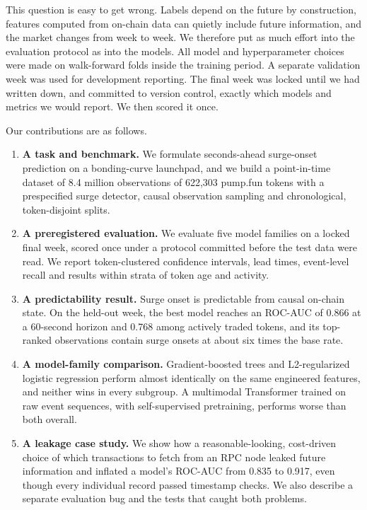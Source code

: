 This question is easy to get wrong. Labels depend on the future by construction, features computed from on-chain data can quietly include future information, and the market changes from week to week. We therefore put as much effort into the evaluation protocol as into the models. All model and hyperparameter choices were made on walk-forward folds inside the training period. A separate validation week was used for development reporting. The final week was locked until we had written down, and committed to version control, exactly which models and metrics we would report. We then scored it once.

Our contributions are as follows.
\begin{enumerate}
  \item \textbf{A task and benchmark.} We formulate seconds-ahead surge-onset prediction on a bonding-curve launchpad, and we build a point-in-time dataset of 8.4 million observations of 622,303 pump.fun tokens with a prespecified surge detector, causal observation sampling and chronological, token-disjoint splits.
  \item \textbf{A preregistered evaluation.} We evaluate five model families on a locked final week, scored once under a protocol committed before the test data were read. We report token-clustered confidence intervals, lead times, event-level recall and results within strata of token age and activity.
  \item \textbf{A predictability result.} Surge onset is predictable from causal on-chain state. On the held-out week, the best model reaches an ROC-AUC of 0.866 at a 60-second horizon and 0.768 among actively traded tokens, and its top-ranked observations contain surge onsets at about six times the base rate.
  \item \textbf{A model-family comparison.} Gradient-boosted trees and L2-regularized logistic regression perform almost identically on the same engineered features, and neither wins in every subgroup. A multimodal Transformer trained on raw event sequences, with self-supervised pretraining, performs worse than both overall.
  \item \textbf{A leakage case study.} We show how a reasonable-looking, cost-driven choice of which transactions to fetch from an RPC node leaked future information and inflated a model's ROC-AUC from 0.835 to 0.917, even though every individual record passed timestamp checks. We also describe a separate evaluation bug and the tests that caught both problems.
\end{enumerate}

